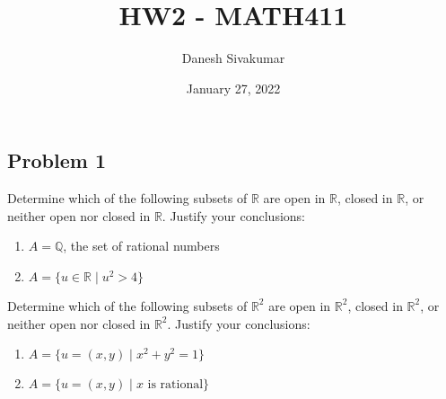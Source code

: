 \documentclass{article}
\title{HW2 - MATH411}
\author{Danesh Sivakumar}
\date{January 27, 2022}
\begin{document}
\maketitle 


\subsection*{Problem 1}

Determine which of the following subsets of $\mathbb{R}$ are open in $\mathbb{R}$, closed in $\mathbb{R}$, or neither open nor closed in $\mathbb{R}$. Justify your conclusions:
\begin{enumerate}[label=(\alph*)]
\item $A = \mathbb{Q}$, the set of rational numbers
\item $A = \{u \in \mathbb{R} \mid u^2 > 4\}$
\end{enumerate}
Determine which of the following subsets of $\mathbb{R}^2$ are open in $\mathbb{R}^2$, closed in $\mathbb{R}^2$, or neither open nor closed in $\mathbb{R}^2$. Justify your conclusions:
\begin{enumerate}[label=(\alph*)]
\item $A = \{u = (x, y) \mid x^2+y^2 = 1\}$
\item $A = \{u = (x, y) \mid x \text{ is rational}\}$ 
\end{enumerate}
\end{document}
